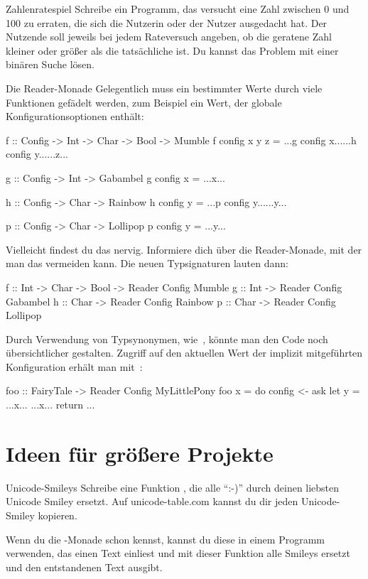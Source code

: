 \documentclass{uebblatt}
\begin{document}
\begin{aufgabe}{Zahlenratespiel}
Schreibe ein Programm, das versucht eine Zahl zwischen 0 und 100 zu erraten, die sich die Nutzerin oder der Nutzer ausgedacht hat. Der Nutzende soll jeweils bei jedem Rateversuch angeben, ob die geratene Zahl kleiner oder größer als die tatsächliche ist. Du kannst das Problem mit einer binären Suche lösen.
\end{aufgabe}

\begin{aufgabe}{Die Reader-Monade}
Gelegentlich muss ein bestimmter Werte durch viele Funktionen gefädelt werden,
zum Beispiel ein Wert, der globale Konfigurationsoptionen enthält:
\begin{haskellcode}
f :: Config -> Int -> Char -> Bool -> Mumble
f config x y z = ...g config x......h config y......z...

g :: Config -> Int -> Gabambel
g config x     = ...x...

h :: Config -> Char -> Rainbow
h config y     = ...p config y......y...

p :: Config -> Char -> Lollipop
p config y     = ...y...
\end{haskellcode}
Vielleicht findest du das nervig. Informiere dich über die Reader-Monade, mit
der man das vermeiden kann. Die neuen Typsignaturen lauten dann:
\begin{haskellcode}
f :: Int -> Char -> Bool -> Reader Config Mumble
g :: Int -> Reader Config Gabambel
h :: Char -> Reader Config Rainbow
p :: Char -> Reader Config Lollipop
\end{haskellcode}
Durch Verwendung von Typsynonymen, wie~,
könnte man den Code noch übersichtlicher gestalten. Zugriff auf den aktuellen
Wert der implizit mitgeführten Konfiguration erhält man mit~:
\begin{haskellcode}
foo :: FairyTale -> Reader Config MyLittlePony
foo x = do
    config <- ask
    let y = ...x...
    ...x...
    return ...
\end{haskellcode}
\end{aufgabe}


\section{Ideen für größere Projekte}

\begin{aufgabe}{Unicode-Smileys}
	Schreibe eine Funktion , die alle "`:-)"' durch deinen liebsten Unicode Smiley ersetzt. Auf unicode-table.com kannst du dir jeden Unicode-Smiley kopieren.

	Wenn du die -Monade schon kennst, kannst du diese in einem Programm verwenden, das einen Text einliest und mit dieser Funktion alle Smileys ersetzt und den entstandenen Text ausgibt.
\end{aufgabe}
\end{document}
